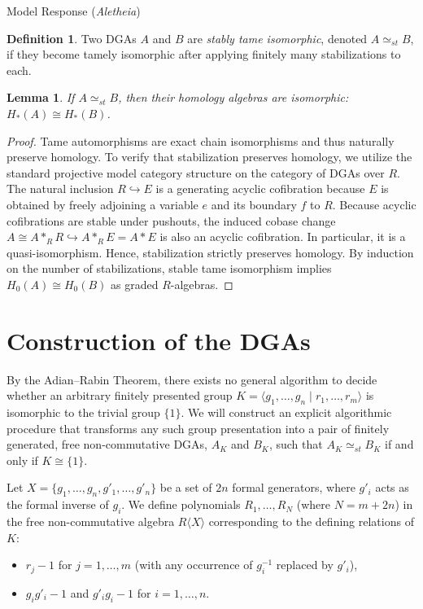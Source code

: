 \documentclass{article}
\theoremstyle{plain}
\newtheorem{lemma}{Lemma}
\theoremstyle{definition}
\newtheorem{definition}[theorem]{Definition}
\newcommand{\Aletheia}{\emph{Aletheia}}
\begin{document}
\begin{solution}{Model Response (\Aletheia)}
\begin{definition}
Two DGAs $A$ and $B$ are \emph{stably tame isomorphic}, denoted $A \simeq_{st} B$, if they become tamely isomorphic after applying finitely many stabilizations to each.
\end{definition}

\begin{lemma} \label{lem:homology}
If $A \simeq_{st} B$, then their homology algebras are isomorphic: $H_*(A) \cong H_*(B)$.
\end{lemma}
\begin{proof}
Tame automorphisms are exact chain isomorphisms and thus naturally preserve homology. To verify that stabilization preserves homology, we utilize the standard projective model category structure on the category of DGAs over $R$. The natural inclusion $R \hookrightarrow E$ is a generating acyclic cofibration because $E$ is obtained by freely adjoining a variable $e$ and its boundary $f$ to $R$. Because acyclic cofibrations are stable under pushouts, the induced cobase change $A \cong A *_R R \hookrightarrow A *_R E = A * E$ is also an acyclic cofibration. In particular, it is a quasi-isomorphism. Hence, stabilization strictly preserves homology. By induction on the number of stabilizations, stable tame isomorphism implies $H_0(A) \cong H_0(B)$ as graded $R$-algebras.
\end{proof}

\section{Construction of the DGAs}

By the Adian--Rabin Theorem, there exists no general algorithm to decide whether an arbitrary finitely presented group $K = \langle g_1, \dots, g_n \mid r_1, \dots, r_m \rangle$ is isomorphic to the trivial group $\{1\}$. We will construct an explicit algorithmic procedure that transforms any such group presentation into a pair of finitely generated, free non-commutative DGAs, $A_K$ and $B_K$, such that $A_K \simeq_{st} B_K$ if and only if $K \cong \{1\}$.

Let $X = \{g_1, \dots, g_n, g'_1, \dots, g'_n\}$ be a set of $2n$ formal generators, where $g'_i$ acts as the formal inverse of $g_i$. We define polynomials $R_1, \dots, R_N$ (where $N = m + 2n$) in the free non-commutative algebra $R\langle X \rangle$ corresponding to the defining relations of $K$:
\begin{itemize}
    \item $r_j - 1$ for $j = 1, \dots, m$ (with any occurrence of $g_i^{-1}$ replaced by $g'_i$),
    \item $g_i g'_i - 1$ and $g'_i g_i - 1$ for $i = 1, \dots, n$.
\end{itemize}


\end{solution}
\end{document}
